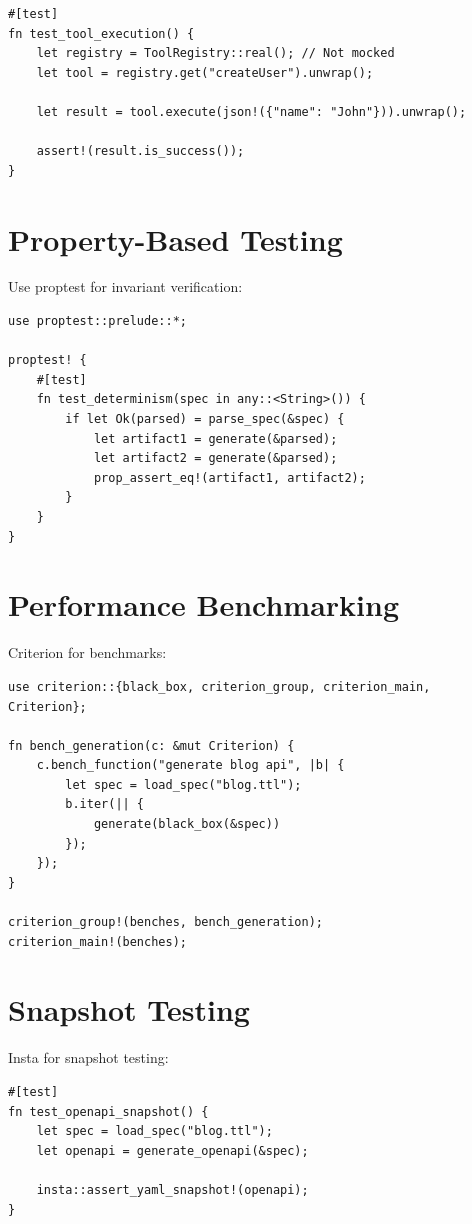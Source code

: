 \begin{verbatim}
#[test]
fn test_tool_execution() {
    let registry = ToolRegistry::real(); // Not mocked
    let tool = registry.get("createUser").unwrap();

    let result = tool.execute(json!({"name": "John"})).unwrap();

    assert!(result.is_success());
}
\end{verbatim}

\section{Property-Based Testing}

Use proptest for invariant verification:

\begin{verbatim}
use proptest::prelude::*;

proptest! {
    #[test]
    fn test_determinism(spec in any::<String>()) {
        if let Ok(parsed) = parse_spec(&spec) {
            let artifact1 = generate(&parsed);
            let artifact2 = generate(&parsed);
            prop_assert_eq!(artifact1, artifact2);
        }
    }
}
\end{verbatim}

\section{Performance Benchmarking}

Criterion for benchmarks:

\begin{verbatim}
use criterion::{black_box, criterion_group, criterion_main, Criterion};

fn bench_generation(c: &mut Criterion) {
    c.bench_function("generate blog api", |b| {
        let spec = load_spec("blog.ttl");
        b.iter(|| {
            generate(black_box(&spec))
        });
    });
}

criterion_group!(benches, bench_generation);
criterion_main!(benches);
\end{verbatim}

\section{Snapshot Testing}

Insta for snapshot testing:

\begin{verbatim}
#[test]
fn test_openapi_snapshot() {
    let spec = load_spec("blog.ttl");
    let openapi = generate_openapi(&spec);

    insta::assert_yaml_snapshot!(openapi);
}
\end{verbatim}

